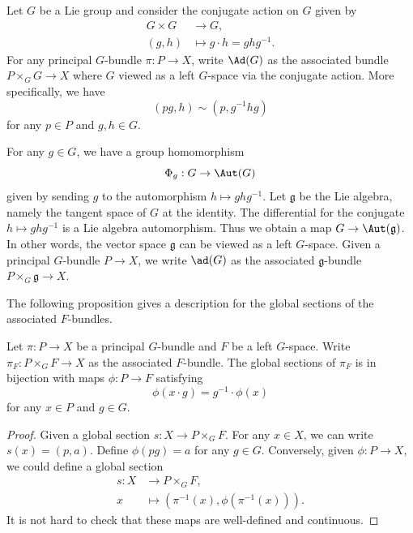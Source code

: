 \begin{example}
    Let \(G\) be a Lie group and consider the conjugate action on \(G\) given by 
    \begin{align*}
         G\times G&\rightarrow G,\\
         (g,h)&\mapsto g\cdot h=ghg^{-1}.
    \end{align*}
    For any principal \(G\)-bundle \(\pi:P\rightarrow X\), write \(\Ad(G)\) as the associated bundle \(P\times_G G\rightarrow X\) where \(G\) viewed as a left \(G\)-space via the conjugate action. More specifically, we have 
    \[(pg,h)\sim (p,g^{-1}hg)\]
    for any \(p\in P\) and \(g,h\in G\). 

    For any \(g\in G\), we have a group homomorphism 
    \[\Phi_g:G\rightarrow \Aut(G)\]
    given by sending \(g\) to the automorphism \(h\mapsto ghg^{-1}\). Let \(\mathfrak{g}\) be the Lie algebra, namely the tangent space of \(G\) at the identity. The differential for the conjugate \(h\mapsto ghg^{-1}\) is a Lie algebra automorphism. Thus we obtain a map \(G\rightarrow \Aut(\mathfrak{g})\). In other words, the vector space \(\mathfrak{g}\) can be viewed as a left \(G\)-space. Given a principal \(G\)-bundle \(P\rightarrow X\), we write \(\ad(G)\) as the associated \(\mathfrak{g}\)-bundle \(P\times_G \mathfrak{g}\rightarrow X\).
\end{example}

The following proposition gives a description for the global sections of the associated \(F\)-bundles.

\begin{proposition}
     Let \(\pi:P\rightarrow X\) be a principal \(G\)-bundle and \(F\) be a left \(G\)-space. Write \(\pi_F:P\times_G F\rightarrow X\) as the associated \(F\)-bundle. The global sections of \(\pi_F\) is in bijection with maps \(\phi:P\rightarrow F\) satisfying 
     \[\phi(x\cdot g)=g^{-1}\cdot \phi(x)\]
     for any \(x\in P\) and \(g\in G\).
\end{proposition}

\begin{proof}
    Given a global section \(s:X\rightarrow P\times_G F\). For any \(x\in X\), we can write \(s(x)=(p,a)\). Define \(\phi(pg)=a\) for any \(g\in G\). Conversely, given \(\phi:P\rightarrow X\), we could define a global section 
    \begin{align*}
         s:X&\rightarrow P\times_G F,\\
         x&\mapsto (\pi^{-1}(x),\phi(\pi^{-1}(x))).
    \end{align*}
    It is not hard to check that these maps are well-defined and continuous. 
\end{proof}

